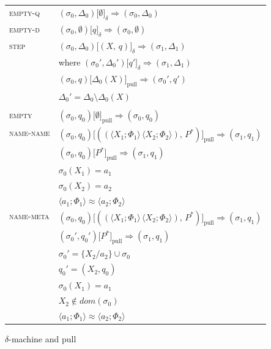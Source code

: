 \documentclass[a4paper,UKenglish]{lipics-v2016}
\newcommand{\clos}[2] {
  \langle #1; #2 \rangle
}
\newcommand{\dframe}[5] {
  (#1, #2) \lbrack #3 \rbrack_\delta\Rightarrow (#4, #5)
}
\newcommand{\pframe}[5] {
  (#1, #2) \lbrack #3 \rbrack_\textrm{pull}\Rightarrow (#4, #5)
}
\newcommand{\pr}[2] {
 (#1\, #2)
}
\newcommand{\bd}[2] {
 #1/ #2
}
\newcommand*{\transname}[1]{\textsc{#1}}
\begin{document}
\begin{wrapfigure}{r}{0.5\textwidth}
\begin{minipage}[b]{0.4\textwidth}
  \caption{$\delta$-machine and pull}\label{machine:delta}
  \begin{tabular}{l l}
    \transname{empty-q} & $\dframe{\sigma_0}{\Delta_0}{\emptyset}{\sigma_0}{\Delta_0}$ \\
    \transname{empty-d} & $\dframe{\sigma_0}{\emptyset}{q}{\sigma_0}{\emptyset}$ \\
    \transname{step}    & $\dframe{\sigma_0}{\Delta_0}{(X,\,q)}{\sigma_1}{\Delta_1}$ \\
                        & where $\dframe{\sigma_0'}{\Delta_0'}{q'}{\sigma_1}{\Delta_1}$ \\
                        & \hspace{8mm} $\pframe{\sigma_0}{q}{\Delta_0(X)}{\sigma_0'}{q'}$ \\
                        & \hspace{8mm} $\Delta_0' = \Delta_0 \setminus \Delta_0(X)$ \\
                        & \\
    \transname{empty}   & $\pframe{\sigma_0}{q_0}{\emptyset}{\sigma_0}{q_0}$ \\
    \transname{name-name}   & $\pframe{\sigma_0}{q_0}{(\pr{\clos{X_1}{\Phi_1}}{\clos{X_2}{\Phi_2}},\,P^*)}{\sigma_1}{q_1}$ \\
                            & \hspace{8mm} $\pframe{\sigma_0}{q_0}{P^*}{\sigma_1}{q_1}$ \\
                            & \hspace{8mm} $\sigma_0(X_1) = a_1$ \\
                            & \hspace{8mm} $\sigma_0(X_2) = a_2$ \\
                            & \hspace{8mm} $\clos{a_1}{\Phi_1} \approx \clos{a_2}{\Phi_2}$ \\
    \transname{name-meta}   & $\pframe{\sigma_0}{q_0}{(\pr{\clos{X_1}{\Phi_1}}{\clos{X_2}{\Phi_2}},\,P^*)}{\sigma_1}{q_1}$ \\
                            & \hspace{8mm} $\pframe{\sigma_0'}{q_0'}{P^*}{\sigma_1}{q_1}$ \\
                            & \hspace{8mm} $\sigma_0' = \{\bd{X_2}{a_2}\} \cup \sigma_0$ \\
                            & \hspace{8mm} $q_0' = (X_2, q_0)$ \\
                            & \hspace{8mm} $\sigma_0(X_1) = a_1$ \\
                            & \hspace{8mm} $ X_2 \notin dom(\sigma_0)$ \\
                            & \hspace{8mm} $\clos{a_1}{\Phi_1} \approx \clos{a_2}{\Phi_2}$ \\
  \end{tabular}


\end{minipage}
\end{wrapfigure}
\end{document}
